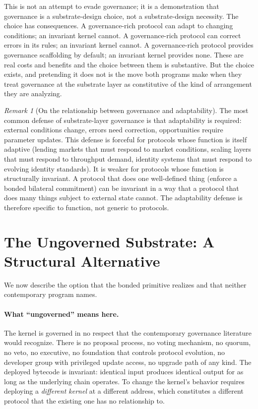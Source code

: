 \documentclass[11pt,a4paper]{article}
\theoremstyle{remark}
\newtheorem{remark}{Remark}[section]
\begin{document}
This is not an attempt to evade governance; it is a
demonstration that governance is a substrate-design choice, not
a substrate-design necessity. The choice has consequences. A
governance-rich protocol can adapt to changing conditions; an
invariant kernel cannot. A governance-rich protocol can correct
errors in its rules; an invariant kernel cannot. A
governance-rich protocol provides governance scaffolding by
default; an invariant kernel provides none. These are real
costs and benefits and the choice between them is substantive.
But the choice exists, and pretending it does not is the move
both programs make when they treat governance at the substrate
layer as constitutive of the kind of arrangement they are
analyzing.

\begin{remark}[On the relationship between governance and adaptability]
The most common defense of substrate-layer governance is that
adaptability is required: external conditions change, errors
need correction, opportunities require parameter updates. This
defense is forceful for protocols whose function is itself
adaptive (lending markets that must respond to market
conditions, scaling layers that must respond to throughput
demand, identity systems that must respond to evolving
identity standards). It is weaker for protocols whose function
is structurally invariant. A protocol that does one well-defined
thing (enforce a bonded bilateral commitment) can be invariant
in a way that a protocol that does many things subject to
external state cannot. The adaptability defense is therefore
specific to function, not generic to protocols.
\end{remark}

\section{The Ungoverned Substrate: A Structural Alternative}
\label{sec:ungoverned-substrate}

We now describe the option that the bonded primitive realizes
and that neither contemporary program names.

\paragraph{What ``ungoverned'' means here.}
The kernel is governed in no respect that the contemporary
governance literature would recognize. There is no proposal
process, no voting mechanism, no quorum, no veto, no executive,
no foundation that controls protocol evolution, no developer
group with privileged update access, no upgrade path of any
kind. The deployed bytecode is invariant: identical input
produces identical output for as long as the underlying chain
operates. To change the kernel's behavior requires deploying a
\emph{different kernel} at a different address, which constitutes
a different protocol that the existing one has no relationship
to.
\end{document}
